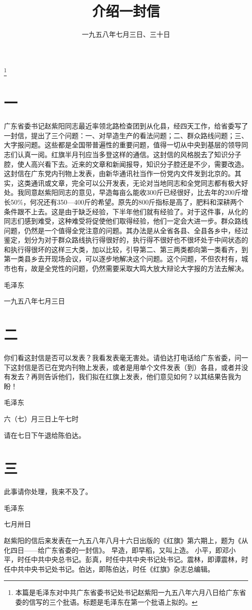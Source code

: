 
\title{介绍一封信}
\date{一九五八年七月三日、三十日}
\thanks{本篇是毛泽东对中共广东省委书记处书记赵紫阳一九五八年六月八日给广东省委的信写的三个批语。标题是毛泽东在第一个批语上拟的。}
\maketitle


\section*{一}

广东省委书记赵紫阳同志最近率领北路检查团到从化县，经四天工作，给省委写了一封信，提出了三个问题：一、对早造生产的看法问题；二、群众路线问题；三、大字报问题。这些都是全国带普遍性的重要问题，值得一切从中央到基层的领导同志们认真一阅。红旗半月刊应当多登这样的通信。这封信的风格脱去了知识分子腔，使人高兴看下去。近来的文章和新闻报导，知识分子腔还是不少，需要改造。这封信在广东党内刊物上发表，由新华通讯社当作一份党内文件发到北京的。其实，这类通讯或文章，完全可以公开发表，无论对当地同志和全党同志都有极大好处。我同意赵紫阳同志的意见，早造每亩么能收300斤已经很好，比去年的200斤增长50\%，何况还有350—400斤的希望。原先的800斤指标是高了，肥料和深耕两个条件跟不上去。这是由于缺乏经验，下半年他们就有经验了。对于这件事，从化的同志们感到难受，这种难受将促使他们取得经验，他们一定会大进一步。群众路线问题，仍然是一个值得全党注意的问题。其办法是从全省各县、全县各乡中，经过鉴定，划分为对于群众路线执行得很好的，执行得不很好也不很坏处于中间状态的和执行得很坏的这样三大类，加以比较，引导第二、第三两类都向第一类看齐，到第一类县乡去开现场会议，可以逐步地解决这个问题。这个问题，不但农村有，城市也有，故是全党性的问题，仍然需要采取大鸣大放大辩论大字报的方法去解决。

毛泽东

一九五八年七月三日

\section*{二}


你们看这封信是否可以发表？我看发表毫无害处。请伯达打电话给广东省委，问一下这封信是否已在党内刊物上发表，或者是用单个文件发表（到）各县，或者并没有发去？再则告诉他们，我们拟在红旗上发表，他们意见如何？以其结果告我为盼！

毛泽东

六（七）月三日上午七时

请在七日下午退给陈伯达。

\section*{三}


此事请你处理，我来不及了。

毛泽东

七月卅日

\begin{maonote}
赵紫阳的信后来发表在一九五八年八月十六日出版的《红旗》第六期上，题为《从化四日——给广东省委的一封信》。
早造，即早稻，又叫上造。
小平，即邓小平，时任中共中央总书记。彭真，时任中共中央书记处书记。震林，即谭震林，时任中共中央书记处书记。伯达，即陈伯达，时任《红旗》杂志总编辑。
\end{maonote}

